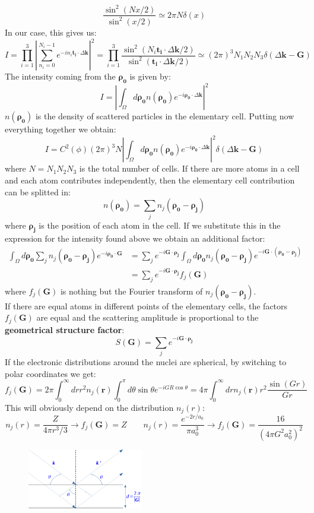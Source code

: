 \documentclass[10.75pt,a4paper,openright,bottom=2cm]{article}
\renewcommand{\Vec}[1]{\boldsymbol{#1}}
\begin{document}
\[
\frac{\sin^2(Nx/2)}{\sin^2(x/2)}\simeq2\pi N\delta(x)
\]
In our case, this gives us:
\[
I=\prod_{i=1}^3\left|\sum_{n_i=0}^{N_i-1}e^{-in_i\Vec{t_i}\cdot\Delta\Vec{k}}\right|^2=\prod_{i=1}^3\frac{\sin^2(N_i\Vec{t_i}\cdot\Delta\Vec{k}/2)}{\sin^2(\Vec{t_i}\cdot\Delta\Vec{k}/2)}\simeq(2\pi)^3N_1N_2N_3\delta(\Delta\Vec{k}-\Vec{G})
\]
The intensity coming from the $\Vec{\rho_0}$ is given by:
\[
I=\left|\int_\Omega d\Vec{\rho_0}n(\Vec{\rho_0})e^{-i\Vec{\rho_0}\cdot\Delta\Vec{k}}\right|^2
\]
$n(\Vec{\rho_0})$ is the density of scattered particles in the elementary cell. Putting now everything together we obtain:
\[
I=C^2(\phi)(2\pi)^3N\left|\int_\Omega d\Vec{\rho_0}n(\Vec{\rho_0})e^{-i\Vec{\rho_0}\cdot\Delta\Vec{k}}\right|^2\delta(\Delta\Vec{k}-\Vec{G})
\]
where $N=N_1N_2N_3$ is the total number of cells. If there are more atoms in a cell and each atom contributes independently, then the elementary cell contribution can be splitted in:
\[
n(\Vec{\rho_0})=\sum_jn_j(\Vec{\rho_0}-\Vec{\rho_j})
\]
where $\Vec{\rho_j}$ is the position of each atom in the cell. If we substitute this in the expression for the intensity found above we obtain an additional factor:
\begin{align*}
\int_\Omega d\Vec{\rho_0}\sum_jn_j(\Vec{\rho_0}-\Vec{\rho_j})e^{-i\Vec{\rho_0}\cdot\Vec{G}}&=\sum_je^{-i\Vec{G}\cdot\Vec{\rho_j}}\int_\Omega d\Vec{\rho_0}n_j(\Vec{\rho_0}-\Vec{\rho_j})e^{-i\Vec{G}\cdot(\Vec{\rho_0}-\Vec{\rho_j})}\\
&=\sum_je^{-i\Vec{G}\cdot\Vec{\rho_j}}f_j(\Vec{G})
\end{align*}
where $f_j(\Vec{G})$ is nothing but the Fourier transform of $n_j(\Vec{\rho_0}-\Vec{\rho_j})$.\\
If there are equal atoms in different points of the elementary cells, the factors $f_j(\Vec{G})$ are equal and the scattering amplitude is proportional to the \textbf{geometrical structure factor}:
\[
S(\Vec{G})=\sum_je^{-i\Vec{G}\cdot\Vec{\rho_j}}
\]
If the electronic distributions around the nuclei are spherical, by switching to polar coordinates we get:
\[
f_j(\Vec{G})=2\pi\int_0^\infty drr^2n_j(\Vec{r})\int_0^\pi d\theta\sin\theta e^{-iGR\cos\theta}=4\pi\int_0^\infty drn_j(\Vec{r})r^2\frac{\sin(Gr)}{Gr}
\]
This will obviously depend on the distribution $n_j(r)$:
\[
n_j(r)=\frac{Z}{4\pi r^3/3}\to f_j(\Vec{G})=Z \qquad n_j(r)=\frac{e^{-2r/a_0}}{\pi a_0^3}\to f_j(\Vec{G})=\frac{16}{(4\pi G^2a_0^2)^2}
\]
\begin{figure}
    \centering
    \includegraphics[width=0.45\textwidth]{bragg.pdf}
    \label{fig:bragg}
\end{figure}
\end{document}
